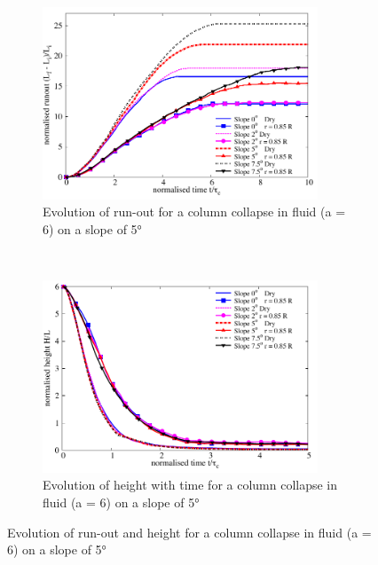 \begin{figure}
\centering
\begin{subfigure}[t]{0.9\textwidth}
\includegraphics[width=0.9\textwidth]{Runout_a6_slope}
\caption{Evolution of run-out for a column collapse in fluid (a = 6) on a 
slope of 5\si{\degree}}
\label{fig:Runout_a6_slope}
\end{subfigure} \\
\begin{subfigure}[t]{0.9\textwidth}
\centering
\includegraphics[width=0.9\textwidth]{Height_a6_slope}
\caption{Evolution of height with time for a column collapse in fluid (a = 6) 
on a slope of 5\si{\degree}}
\label{fig:Height_a6_slope}
\end{subfigure}
\caption{Evolution of  run-out and height  for a column collapse in fluid (a = 
6) on a slope of 5\si{\degree}}
\label{fig:a6_slope}
\end{figure}

